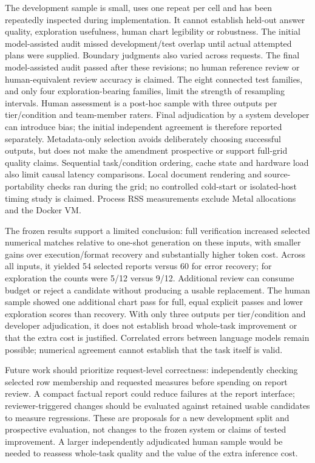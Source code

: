 The development sample is small, uses one repeat per cell and has been repeatedly inspected during implementation. It cannot establish held-out answer quality, exploration usefulness, human chart legibility or robustness. The initial model-assisted audit missed development/test overlap until actual attempted plans were supplied. Boundary judgments also varied across requests. The final model-assisted audit passed after these revisions; no human reference review or human-equivalent review accuracy is claimed. The eight connected test families, and only four exploration-bearing families, limit the strength of resampling intervals. Human assessment is a post-hoc sample with three outputs per tier/condition and team-member raters. Final adjudication by a system developer can introduce bias; the initial independent agreement is therefore reported separately. Metadata-only selection avoids deliberately choosing successful outputs, but does not make the amendment prospective or support full-grid quality claims. Sequential task/condition ordering, cache state and hardware load also limit causal latency comparisons. Local document rendering and source-portability checks ran during the grid; no controlled cold-start or isolated-host timing study is claimed. Process RSS measurements exclude Metal allocations and the Docker VM.

The frozen results support a limited conclusion: full verification increased selected numerical matches relative to one-shot generation on these inputs, with smaller gains over execution/format recovery and substantially higher token cost. Across all inputs, it yielded 54 selected reports versus 60 for error recovery; for exploration the counts were 5/12 versus 9/12. Additional review can consume budget or reject a candidate without producing a usable replacement. The human sample showed one additional chart pass for full, equal explicit passes and lower exploration scores than recovery. With only three outputs per tier/condition and developer adjudication, it does not establish broad whole-task improvement or that the extra cost is justified. Correlated errors between language models remain possible; numerical agreement cannot establish that the task itself is valid.

Future work should prioritize request-level correctness: independently checking selected row membership and requested measures before spending on report review. A compact factual report could reduce failures at the report interface; reviewer-triggered changes should be evaluated against retained usable candidates to measure regressions. These are proposals for a new development split and prospective evaluation, not changes to the frozen system or claims of tested improvement. A larger independently adjudicated human sample would be needed to reassess whole-task quality and the value of the extra inference cost.

